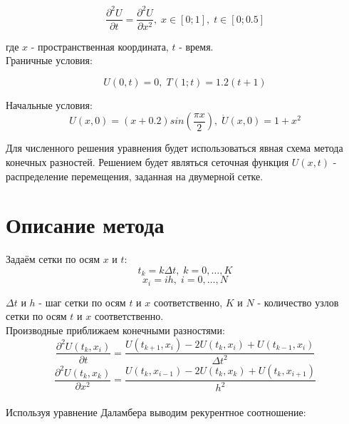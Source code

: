 \documentclass[a4paper,fontsize=14pt]{article}
\begin{document}
	\begin{equation}
	\frac{\partial^2 U}{\partial t} = \frac{\partial^2 U}{\partial x^2}, \; x \in [0; 1], \; t \in [0; 0.5]
	\end{equation}

	где $x$ - пространственная координата, $t$ - время.\\
	
	Граничные условия:
	
	\begin{equation}
	U(0,t)=0, \; T(1;t)=1.2(t+1)
	\end{equation}
	
	Начальные условия:
	\begin{equation}
	U(x, 0) = (x+0.2)sin(\frac{\pi x}{2}), \; \dot{U}(x,0)=1+x^2
	\end{equation}
	
	
	Для численного решения уравнения будет использоваться явная схема метода конечных разностей. Решением будет являться сеточная функция $U(x, t)$ - распределение перемещения, заданная на двумерной сетке.

	\section{Описание метода}
	
	Задаём сетки по осям $x$ и $t$:
	\begin{equation}
		t_k = k\Delta t,\; k=0,\dots,K	
	\end{equation}
	\begin{equation}
		x_i=ih, \; i=0,\dots,N
	\end{equation}
	
	$\Delta t$ и $h$ - шаг сетки по осям $t$ и $x$ соответственно, $K$ и $N$ - количество узлов сетки по осям $t$ и $x$ соответственно. \\
	
	Производные приближаем конечными разностями: \\
	\begin{equation}
		\frac{\partial^2 U(t_k, x_i)}{\partial t} = \frac{U(t_{k+1}, x_i) - 2U(t_k, x_i) + U(t_{k-1}, x_i)}{\Delta t^2}
	\end{equation}
	\begin{equation}
		\frac{\partial^2 U(t_k, x_k)}{\partial x^2} = \frac{U(t_k, x_{i-1}) - 2U(t_k, x_k) + U(t_k, x_{i+1})}{h^2}
	\end{equation} \\
	
	Используя уравнение Даламбера выводим рекурентное соотношение: \\
	
\end{document}
